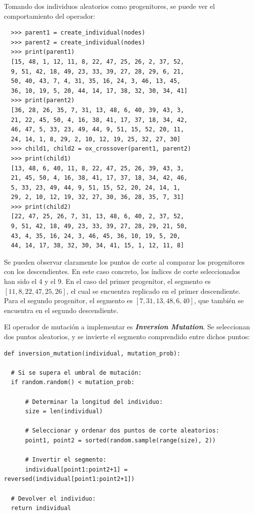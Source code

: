 Tomando dos individuos aleatorios como progenitores, se puede ver el comportamiento del operador:

\begin{verbatim}
  >>> parent1 = create_individual(nodes)          
  >>> parent2 = create_individual(nodes)
  >>> print(parent1)
  [15, 48, 1, 12, 11, 8, 22, 47, 25, 26, 2, 37, 52, 
  9, 51, 42, 18, 49, 23, 33, 39, 27, 28, 29, 6, 21, 
  50, 40, 43, 7, 4, 31, 35, 16, 24, 3, 46, 13, 45, 
  36, 10, 19, 5, 20, 44, 14, 17, 38, 32, 30, 34, 41]
  >>> print(parent2)
  [36, 28, 26, 35, 7, 31, 13, 48, 6, 40, 39, 43, 3, 
  21, 22, 45, 50, 4, 16, 38, 41, 17, 37, 18, 34, 42, 
  46, 47, 5, 33, 23, 49, 44, 9, 51, 15, 52, 20, 11, 
  24, 14, 1, 8, 29, 2, 10, 12, 19, 25, 32, 27, 30]
  >>> child1, child2 = ox_crossover(parent1, parent2)
  >>> print(child1)
  [13, 48, 6, 40, 11, 8, 22, 47, 25, 26, 39, 43, 3, 
  21, 45, 50, 4, 16, 38, 41, 17, 37, 18, 34, 42, 46, 
  5, 33, 23, 49, 44, 9, 51, 15, 52, 20, 24, 14, 1, 
  29, 2, 10, 12, 19, 32, 27, 30, 36, 28, 35, 7, 31]
  >>> print(child2)
  [22, 47, 25, 26, 7, 31, 13, 48, 6, 40, 2, 37, 52, 
  9, 51, 42, 18, 49, 23, 33, 39, 27, 28, 29, 21, 50, 
  43, 4, 35, 16, 24, 3, 46, 45, 36, 10, 19, 5, 20, 
  44, 14, 17, 38, 32, 30, 34, 41, 15, 1, 12, 11, 8]
\end{verbatim}

Se pueden observar claramente los puntos de corte al comparar los progenitores con los descendientes. En este caso  
concreto, los índices de corte seleccionados han sido el 4 y el 9. En el caso del primer progenitor, el segmento es
$[11, 8, 22, 47, 25, 26]$, el cual se encuentra replicado en el primer descendiente. Para el segundo progenitor, el
segmento es $[7, 31, 13, 48, 6, 40]$, que también se encuentra en el segundo descendiente.

El operador de mutación a implementar es \textbf{\textit{Inversion Mutation}}. Se seleccionan dos puntos aleatorios,
y se invierte el segmento comprendido entre dichos puntos:
\newline
\begin{lstlisting}[style=PythonStyle]
def inversion_mutation(individual, mutation_prob):

  # Si se supera el umbral de mutación:
  if random.random() < mutation_prob:

      # Determinar la longitud del individuo:
      size = len(individual)

      # Seleccionar y ordenar dos puntos de corte aleatorios:
      point1, point2 = sorted(random.sample(range(size), 2))

      # Invertir el segmento:
      individual[point1:point2+1] = reversed(individual[point1:point2+1])

  # Devolver el individuo:
  return individual
\end{lstlisting}

